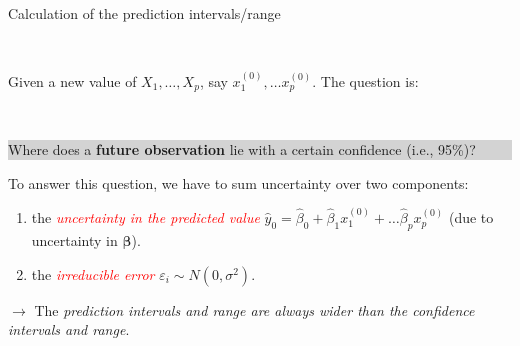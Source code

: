\documentclass[10pt,ignorenonframetext,]{beamer}
\begin{document}
\begin{frame}

\begin{block}{Calculation of the prediction intervals/range}

\(~\)

Given a new value of \(X_1, \ldots, X_p\), say
\(x_1^{(0)}, \ldots x_p^{(0)}\). The question is:

\(~\)

\colorbox{lightgray}{\begin{minipage}{10cm}
Where does a {\bf future observation} lie with a certain confidence (i.e., 95\%)?
\end{minipage}}

\vspace{4mm}

To answer this question, we have to sum uncertainty over two components:

\begin{enumerate}
\def\labelenumi{\arabic{enumi}.}
\item
  the \emph{\textcolor{red}{uncertainty in the predicted value}}
  \(\hat y_0 = \hat\beta_0 + \hat\beta_1 x_1^{(0)} + \ldots \hat\beta_p x_p^{(0)}\)
  (due to uncertainty in \(\hat{\boldsymbol\beta}\)).
\item
  the \emph{\textcolor{red}{irreducible error}}
  \(\varepsilon_i \sim N(0,\sigma^2)\).
\end{enumerate}

\vspace{4mm}

\(\rightarrow\) The \emph{prediction intervals and range are always
wider than the confidence intervals and range}.

\end{block}

\end{frame}
\end{document}
